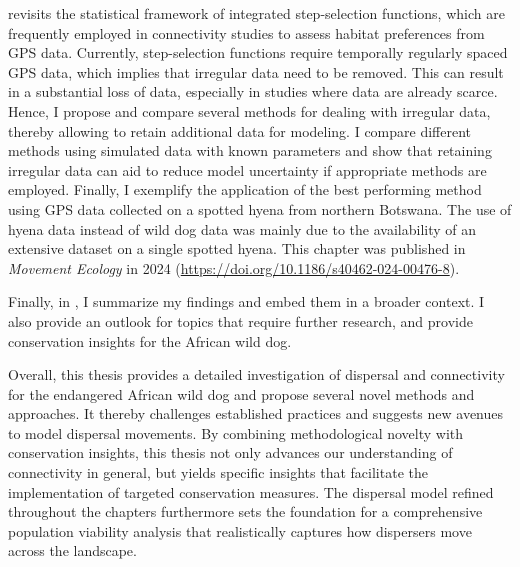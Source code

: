 \documentclass[abstract=on,twoside,10pt,a4paper,bibliography=totocnumbered]{report}
\begin{document}
 revisits the statistical framework of integrated
step-selection functions, which are frequently employed in connectivity studies
to assess habitat preferences from GPS data. Currently, step-selection functions
require temporally regularly spaced GPS data, which implies that irregular data
need to be removed. This can result in a substantial loss of data, especially in
studies where data are already scarce. Hence, I propose and compare several
methods for dealing with irregular data, thereby allowing to retain additional
data for modeling. I compare different methods using simulated data with known
parameters and show that retaining irregular data can aid to reduce model
uncertainty if appropriate methods are employed. Finally, I exemplify the
application of the best performing method using GPS data collected on a spotted
hyena from northern Botswana. The use of hyena data instead of wild dog data was
mainly due to the availability of an extensive dataset on a single spotted
hyena. This chapter was published in \textit{Movement Ecology} in 2024
(\url{https://doi.org/10.1186/s40462-024-00476-8}).

Finally, in , I summarize my findings and embed them in
a broader context. I also provide an outlook for topics that require further
research, and provide conservation insights for the African wild dog.

Overall, this thesis provides a detailed investigation of dispersal and
connectivity for the endangered African wild dog and propose several novel
methods and approaches. It thereby challenges established practices and suggests
new avenues to model dispersal movements. By combining methodological novelty
with conservation insights, this thesis not only advances our understanding of
connectivity in general, but yields specific insights that facilitate the
implementation of targeted conservation measures. The dispersal model refined
throughout the chapters furthermore sets the foundation for a comprehensive
population viability analysis that realistically captures how dispersers move
across the landscape.

\newpage

\begin{onehalfspacing}
\pagestyle{empty}
\tableofcontents
\end{onehalfspacing}
\newpage

\pagestyle{fancy}
\fancyhf{}
\fancyhead[LO]{\rightmark}
\fancyhead[RO]{\thepage}
\fancyhead[RE]{\rightmark}
\fancyhead[LE]{\thepage}
\end{document}
